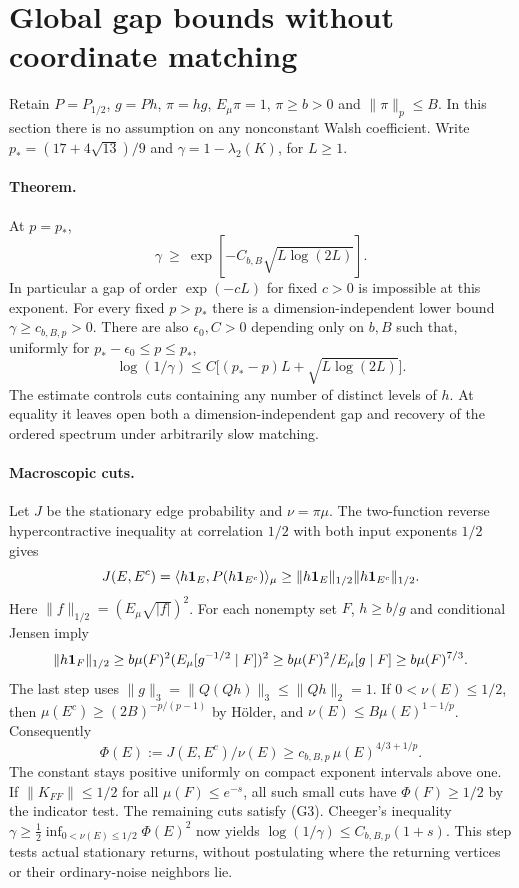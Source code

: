 \section{Global gap bounds without coordinate matching}
\label{sec:gap-without-matching}

Retain $P=P_{1/2}$, $g=Ph$, $\pi=hg$, $E_\mu\pi=1$,
$\pi\ge b>0$ and $\|\pi\|_p\le B$. In this section there is no
assumption on any nonconstant Walsh coefficient. Write
$p_*=(17+4\sqrt{13})/9$ and $\gamma=1-\lambda_2(K)$, for $L\ge1$.

\paragraph{Theorem.}
At $p=p_*$,
\[
 \gamma\ \ge\ \exp[-C_{b,B}\sqrt{L\log(2L)}].
 \tag{G1}
\]
In particular a gap of order $\exp(-cL)$ for fixed $c>0$ is impossible
at this exponent. For every fixed $p>p_*$ there is a dimension-independent
lower bound $\gamma\ge c_{b,B,p}>0$. There are also $\epsilon_0,C>0$
depending only on $b,B$ such that, uniformly for $p_*-\epsilon_0\le p\le p_*$,
\[
 \log(1/\gamma)\le C\big[(p_*-p)L+\sqrt{L\log(2L)}\big]. \tag{G2}
\]
The estimate controls cuts containing any number of distinct levels of
$h$. At equality it leaves open both a dimension-independent gap and
recovery of the ordered spectrum under arbitrarily slow matching.

\paragraph{Macroscopic cuts.}
Let $J$ be the stationary edge probability and $\nu=\pi\mu$.
The two-function reverse hypercontractive inequality at correlation $1/2$
with both input exponents $1/2$ gives
\[
 J(E,E^c)=\langle h{\bf1}_E,P(h{\bf1}_{E^c})\rangle_\mu
 \ge \|h{\bf1}_E\|_{1/2}\|h{\bf1}_{E^c}\|_{1/2}.
\]
Here $\|f\|_{1/2}=(E_\mu\sqrt{|f|})^2$. For each nonempty set $F$,
$h\ge b/g$ and conditional Jensen imply
\[
 \|h{\bf1}_F\|_{1/2}\ge
 b\mu(F)^2(E_\mu[g^{-1/2}\mid F])^2
 \ge b\mu(F)^2/E_\mu[g\mid F]\ge b\mu(F)^{7/3}.
\]
The last step uses $\|g\|_3=\|Q(Qh)\|_3\le\|Qh\|_2=1$.
If $0<\nu(E)\le1/2$, then $\mu(E^c)\ge (2B)^{-p/(p-1)}$ by
H\"older, and $\nu(E)\le B\mu(E)^{1-1/p}$. Consequently
\[
 \Phi(E):=J(E,E^c)/\nu(E)\ge c_{b,B,p}\,\mu(E)^{4/3+1/p}. \tag{G3}
\]
The constant stays positive uniformly on compact exponent intervals above one.
If $\|K_{FF}\|\le1/2$ for all $\mu(F)\le e^{-s}$, all such small cuts
have $\Phi(F)\ge1/2$ by the indicator test. The remaining cuts satisfy
(G3). Cheeger's inequality $\gamma\ge \frac12\inf_{0<\nu(E)\le1/2}
\Phi(E)^2$ now yields $\log(1/\gamma)\le C_{b,B,p}(1+s)$.
This step tests actual stationary returns, without postulating where
the returning vertices or their ordinary-noise neighbors lie.

